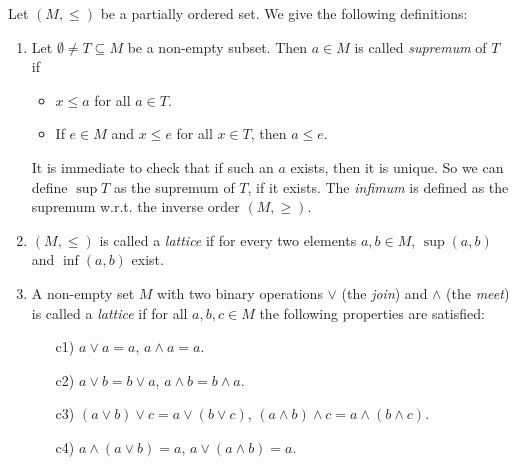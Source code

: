 \documentclass[12pt,a4paper]{report}
\theoremstyle{definition}
\theoremstyle{num.custom-title}
\DeclareMathOperator{\sse}{\subseteq}
\begin{document}
Let $(M,\leq)$ be a partially ordered set. We give the following definitions:
\begin{enumerate}
\item Let $\emptyset \neq T \sse M$ be a non-empty subset. Then $a \in M$ is called \emph{supremum} of $T$ if
\begin{itemize}
\item $x \leq a$ for all $a \in T$.
\item If $e \in M$ and $x \leq e$ for all $x \in T$, then $a \leq e$.
\end{itemize}
It is immediate to check that if such an $a$ exists, then it is unique. So we can define $\sup T$ as the supremum of $T$, if it exists. The \emph{infimum} is defined as the supremum w.r.t. the inverse order $(M,\geq)$.
\item $(M,\leq)$ is called a \emph{lattice} if for every two elements $a,b \in M$, $\sup(a,b)$ and $\inf(a,b)$ exist.
\item A non-empty set $M$ with two binary operations $\vee$ (the \emph{join}) and $\wedge$ (the \emph{meet}) is called a \emph{lattice} if for all $a,b,c \in M$ the following properties are satisfied:
\begin{enumerate}
\item[c1)] $a \vee a = a$, $a \wedge a = a$.
\item[c2)] $a \vee b = b \vee a$, $a \wedge b = b \wedge a$.
\item[c3)] $(a \vee b) \vee c = a \vee (b \vee c)$, $(a \wedge b) \wedge c = a \wedge (b \wedge c)$.
\item[c4)] $a \wedge (a \vee b) = a$, $a \vee (a \wedge b) = a$.
\end{enumerate}
\end{enumerate}
\end{document}
